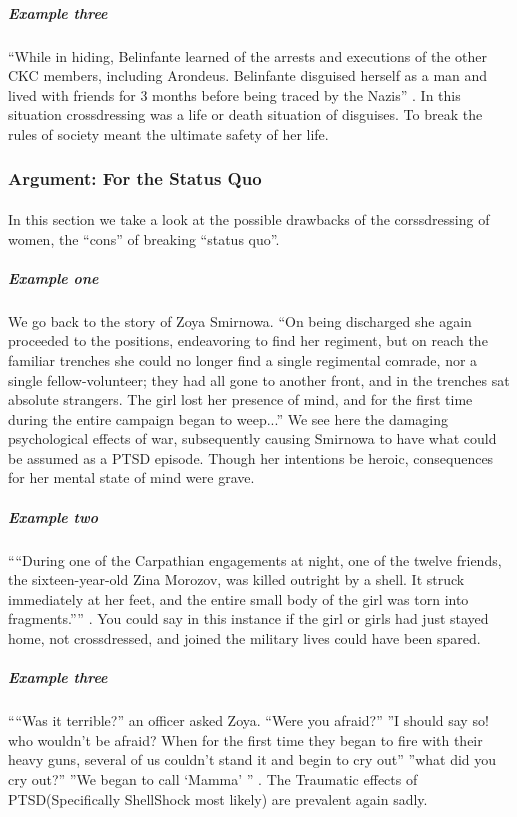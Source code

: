 \subparagraph{Example three}
``While in hiding, Belinfante learned of the arrests and executions of the other
CKC members, including Arondeus. Belinfante disguised herself as a man and lived
with friends for 3 months  before being traced by the Nazis''
\cite[t.~00:28:40-00:39:00]{BIWG}. In this situation crossdressing was a life or
death situation of disguises. To break the rules of society meant the ultimate
safety of her life.
\par

\subsubsection{Argument: For the Status Quo}

\paragraph{}
In this section we take a look at the possible drawbacks of the corssdressing of
women, the ``cons'' of breaking ``status quo''.

\subparagraph{Example one}
We go back to the story of Zoya Smirnowa. ``On being discharged she again
proceeded to the positions, endeavoring to find her regiment, but on reach the
familiar trenches she could no longer find a single regimental comrade, nor a
single fellow-volunteer; they had all gone to another front, and in the trenches
sat absolute strangers. The girl lost her presence of mind, and for the first
time during the entire campaign began to weep...'' \cite[p.~367]{YGFRF} We see
here the damaging psychological effects of war, subsequently causing Smirnowa to
have what could be assumed as a PTSD episode. Though her intentions be heroic,
consequences for her mental state of mind were grave.
\par

\subparagraph{Example two}
````During one of the Carpathian engagements at night, one of the twelve
friends, the sixteen-year-old Zina Morozov, was killed outright by a shell.
It struck immediately at her feet, and the entire small body of the girl was
torn into fragments.'''' \cite[p.~366]{YGFRF}. You could say in this instance if
the girl or girls had just stayed home, not crossdressed, and joined the
military lives could have been spared.
\par

\subparagraph{Example three}
````Was it terrible?'' an officer asked Zoya. ``Were you afraid?'' ''I should
say so! who wouldn't be afraid? When for the first time they began to fire with
their heavy guns, several of us couldn't stand it and begin to cry out'' ''what
did you cry out?'' ''We began to call `Mamma' '' \cite[p.~366]{YGFRF}. The
Traumatic effects of PTSD(Specifically ShellShock most likely) are prevalent
again sadly.
\par

